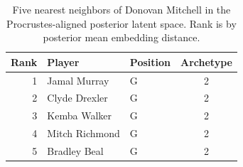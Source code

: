 \begin{table}[htbp]
  \centering\small
  \begin{tabular}{rllc}
    \toprule
    Rank & Player & Position & Archetype \\
    \midrule
    1 & Jamal Murray & G & 2 \\
    2 & Clyde Drexler & G & 2 \\
    3 & Kemba Walker & G & 2 \\
    4 & Mitch Richmond & G & 2 \\
    5 & Bradley Beal & G & 2 \\
    \bottomrule
  \end{tabular}
  \caption{Five nearest neighbors of Donovan Mitchell in the Procrustes-aligned posterior latent space. Rank is by posterior mean embedding distance.}
  \label{tab:Donovan_Mitchell_neighbors}
\end{table}

